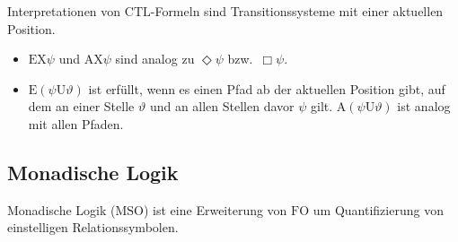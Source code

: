 \documentclass{panikzettel}
\newcommand{\FO}{\mathrm{FO}}
\newcommand{\MSO}{\mathrm{MSO}}
\newcommand{\CTL}{\mathrm{CTL}}
\newcommand{\X}{\mathrm{X}}
\newcommand{\until}{\mathrm{U}}
\begin{document}
Interpretationen von $\CTL$-Formeln sind Transitionssysteme mit einer aktuellen Position.
\begin{itemize}
\item $\mathrm{E}\X\psi$ und $\mathrm{A}\X\psi$ sind analog zu $\Diamond \psi$ bzw.\ $\Box \psi$.
\item $\mathrm{E}(\psi \until \vartheta)$ ist erfüllt, wenn es einen Pfad ab der aktuellen Position gibt, auf dem an einer Stelle $\vartheta$ und an allen Stellen davor $\psi$ gilt. $\mathrm{A}(\psi \until \vartheta)$ ist analog mit allen Pfaden.
\end{itemize}

\subsection{Monadische Logik}

Monadische Logik ($\MSO$) ist eine Erweiterung von $\FO$ um Quantifizierung von einstelligen Relationssymbolen.
\end{document}
